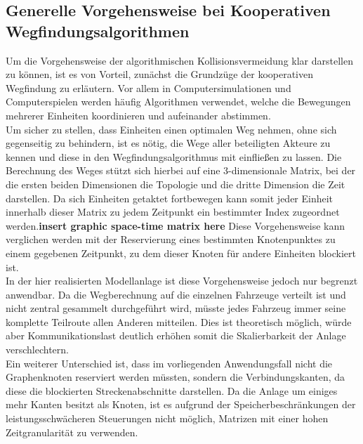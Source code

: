 	\subsection{Generelle Vorgehensweise bei Kooperativen Wegfindungsalgorithmen}
		\label{Coop Pathfinding}
		Um die Vorgehensweise der algorithmischen Kollisionsvermeidung klar darstellen zu können, ist es von Vorteil, zunächst die Grundzüge der kooperativen Wegfindung zu erläutern. Vor allem in Computersimulationen und Computerspielen werden häufig Algorithmen verwendet, welche die Bewegungen mehrerer Einheiten koordinieren und aufeinander abstimmen. 
		\\
		Um sicher zu stellen, dass Einheiten einen optimalen Weg nehmen, ohne sich gegenseitig zu behindern, ist es nötig, die Wege aller beteiligten Akteure zu kennen und diese in den Wegfindungsalgorithmus mit einfließen zu lassen. Die Berechnung des Weges stützt sich hierbei auf eine 3-dimensionale Matrix, bei der die ersten beiden Dimensionen die Topologie und die dritte Dimension die Zeit darstellen. Da sich Einheiten getaktet fortbewegen kann somit jeder Einheit innerhalb dieser Matrix zu jedem Zeitpunkt ein bestimmter Index zugeordnet werden\cite{Silver2005}.\textbf{insert graphic space-time matrix here} Diese Vorgehensweise kann verglichen werden mit der Reservierung eines bestimmten Knotenpunktes zu einem gegebenen Zeitpunkt, zu dem dieser Knoten für andere Einheiten blockiert ist\cite{Erdmann1986}.
		\\
		In der hier realisierten Modellanlage ist diese Vorgehensweise jedoch nur begrenzt anwendbar. Da die Wegberechnung auf die einzelnen Fahrzeuge verteilt ist und nicht zentral gesammelt durchgeführt wird, müsste jedes Fahrzeug immer seine komplette Teilroute allen Anderen mitteilen. Dies ist theoretisch möglich, würde aber Kommunikationslast deutlich erhöhen somit die Skalierbarkeit der Anlage verschlechtern.
		\\
		Ein weiterer Unterschied ist, dass im vorliegenden Anwendungsfall nicht die Graphenknoten reserviert werden müssten, sondern die Verbindungskanten, da diese die blockierten Streckenabschnitte darstellen. Da die Anlage um einiges mehr Kanten besitzt als Knoten, ist es aufgrund der Speicherbeschränkungen der leistungsschwächeren Steuerungen nicht möglich, Matrizen mit einer hohen Zeitgranularität zu verwenden.

